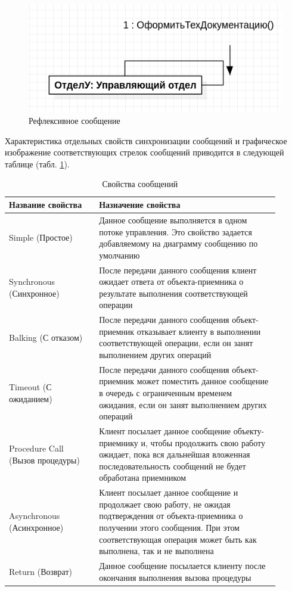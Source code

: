 \documentclass[a4paper,12pt]{extreport}
\begin{document}
\begin{figure}[h!]
	\centering
	\includegraphics[width=0.6\linewidth]{images/message3}
	\caption{Рефлексивное сообщение}
	\label{fig:message3}
\end{figure}

Характеристика отдельных свойств синхронизации сообщений и графическое изображение соответствующих стрелок сообщений приводится в следующей таблице (табл. \ref{tab:messages}).

\begin{table}[h!]

	\begin{tabular}{|m{0.3\linewidth}|m{0.6\linewidth}|}
		\hline
	\textbf{Название свойства} & \textbf{Назначение свойства} \\ \hline
		Simple 
		(Простое) & Данное сообщение выполняется в одном потоке управления. Это свойство задается добавляемому на диаграмму сообщению по умолчанию \\ \hline
		Synchronous 
		(Синхронное) & После передачи данного сообщения клиент ожидает ответа от объекта-приемника о результате выполнения соответствующей операции \\ \hline
		Balking 
		(С отказом) & После передачи данного сообщения объект-приемник отказывает клиенту в выполнении соответствующей операции, если он занят выполнением других операций \\ \hline
		Timeout 
		(С ожиданием) & После передачи данного сообщения объект-приемник может поместить данное сообщение в очередь с ограниченным временем ожидания, если он занят выполнением других операций \\ \hline
		Procedure Call
		(Вызов процедуры) & Клиент посылает данное сообщение объекту-приемнику и, чтобы продолжить свою работу ожидает, пока вся дальнейшая вложенная последовательность сообщений не будет обработана приемником \\ \hline
		Asynchronous
		(Асинхронное) & Клиент посылает данное сообщение и продолжает свою работу, не ожидая подтверждения от объекта-приемника о получении этого сообщения. При этом соответствующая операция может быть как выполнена, так и не выполнена \\ \hline
		Return (Возврат) & Данное сообщение посылается клиенту после окончания выполнения вызова процедуры \\ \hline
	\end{tabular}
	\caption{Свойства сообщений}
	\label{tab:messages}
\end{table}
\newpage
\end{document}

